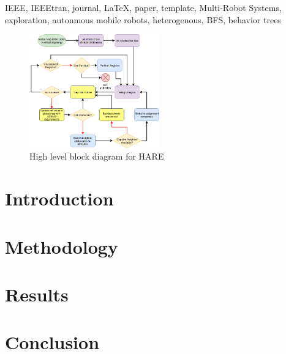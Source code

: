 \documentclass[conference]{IEEEtran}
\begin{document}
\begin{IEEEkeywords}
IEEE, IEEEtran, journal, \LaTeX, paper, template, Multi-Robot Systems, exploration, autonmous mobile robots, heterogenous, BFS, behavior trees
\end{IEEEkeywords}


\IEEEpeerreviewmaketitle

\begin{figure}[H]
  \centering
    \includegraphics[width=0.5\textwidth]{HARE}
  \caption{High level block diagram for HARE}
  \label{fig:something3}
\end{figure}

\section{Introduction}


\section{Methodology}

\section{Results}

\section{Conclusion}
\end{document}
